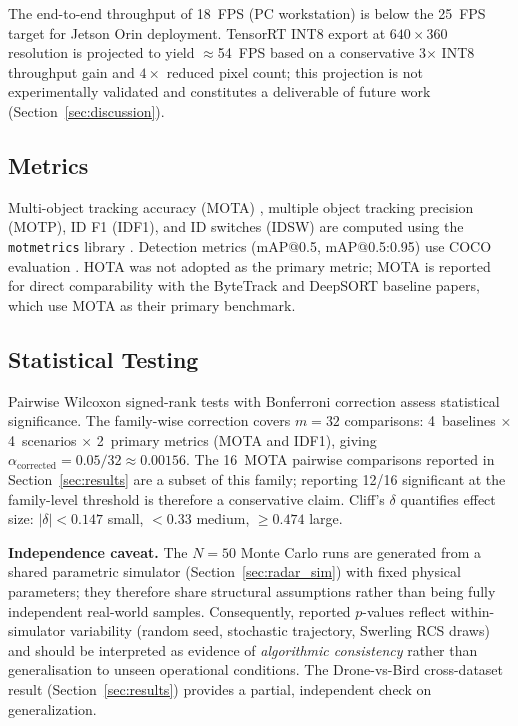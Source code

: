 \documentclass[drones,article,submit,pdftex]{Definitions/mdpi}
\begin{document}
The end-to-end throughput of 18~FPS (PC workstation) is below the
\SI{25}{FPS} target for Jetson Orin deployment.
TensorRT INT8 export at $640\!\times\!360$ resolution is projected to yield
$\approx$54~FPS based on a conservative 3$\times$ INT8 throughput gain and
$4\times$ reduced pixel count; this projection is not experimentally validated
and constitutes a deliverable of future work (Section~\ref{sec:discussion}).

\subsection{Metrics}

Multi-object tracking accuracy (MOTA) \cite{ref_mot_metrics},
multiple object tracking precision (MOTP), ID F1 (IDF1), and
ID switches (IDSW) are computed using the \texttt{motmetrics} library \cite{ref_motmetrics}.
Detection metrics (mAP@0.5, mAP@0.5:0.95) use COCO evaluation \cite{ref_coco}.
HOTA \cite{ref_hota} was not adopted as the primary metric;
MOTA is reported for direct comparability with the ByteTrack and DeepSORT baseline papers,
which use MOTA as their primary benchmark.

\subsection{Statistical Testing}

Pairwise Wilcoxon signed-rank tests \cite{ref_wilcoxon} with Bonferroni correction
assess statistical significance.
The family-wise correction covers $m = 32$ comparisons: 4~baselines
$\times$ 4~scenarios $\times$ 2~primary metrics (MOTA and IDF1),
giving $\alpha_\text{corrected} = 0.05 / 32 \approx 0.00156$.
The 16~MOTA pairwise comparisons reported in Section~\ref{sec:results}
are a subset of this family; reporting 12/16 significant at the
family-level threshold is therefore a conservative claim.
Cliff's $\delta$ quantifies effect size: $|\delta| < 0.147$ small,
$< 0.33$ medium, $\geq 0.474$ large.

\textbf{Independence caveat.}
The $N = 50$ Monte Carlo runs are generated from a shared parametric simulator
(Section~\ref{sec:radar_sim}) with fixed physical parameters; they therefore share
structural assumptions rather than being fully independent real-world samples.
Consequently, reported $p$-values reflect within-simulator variability (random seed,
stochastic trajectory, Swerling RCS draws) and should be interpreted as evidence of
\emph{algorithmic consistency} rather than generalisation to unseen operational
conditions.
The Drone-vs-Bird cross-dataset result (Section~\ref{sec:results}) provides a
partial, independent check on generalization.
\end{document}
